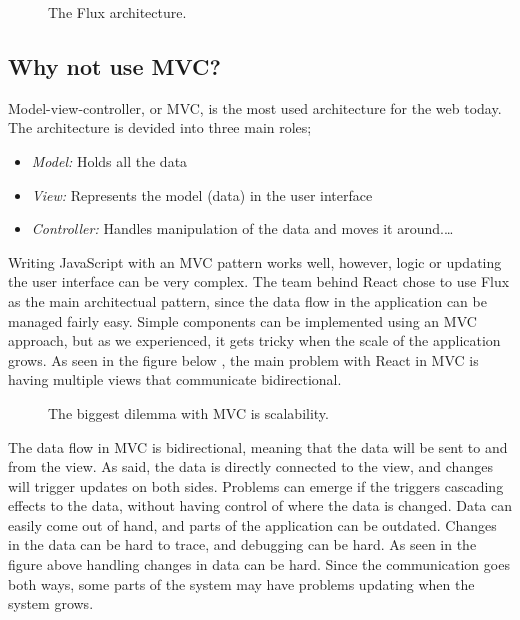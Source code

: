 \begin{figure}[h]
\centering
{}
\caption{The Flux architecture.}
\end{figure}




\subsection{Why not use MVC?}

Model-view-controller, or MVC, is the most used architecture for the web today. The architecture is devided into three main roles;
\begin{itemize}  
\item \emph{Model:} Holds all the data
\item \emph{View:} Represents the model (data) in the user interface
\item \emph{Controller:} Handles manipulation of the data and moves it around.\ldots 
\end{itemize}

Writing JavaScript with an MVC pattern works well, however, logic or updating the user interface can be very complex. The team behind React chose to use Flux as the main architectual pattern, since the data flow in the application can be managed fairly easy. Simple components can be implemented using an MVC approach, but as we experienced, it gets tricky when the scale of the application grows. As seen in the figure below , the main problem with React in MVC is having multiple views that communicate bidirectional.

\begin{figure}[h]
\centering
{}
\caption{The biggest dilemma with MVC is scalability.}
\end{figure}

The data flow in MVC is bidirectional, meaning that the data will be sent to and from the view. As said, the data is directly connected to the view, and changes will trigger updates on both sides. Problems can emerge if the triggers cascading effects to the data, without having control of where the data is changed. Data can easily come out of hand, and parts of the application can be outdated. Changes in the data can be hard to trace, and debugging can be hard. As seen in the figure above  handling changes in data can be hard. Since the communication goes both ways, some parts of the system may have problems updating when the system grows.

